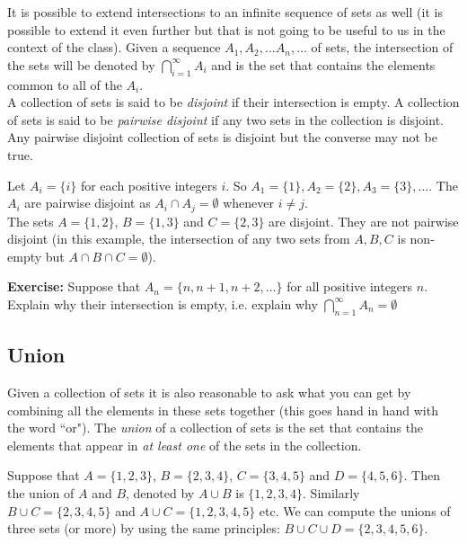 \begin{appendices}
		It is possible to extend intersections to an infinite sequence of sets as well (it is possible to extend it even further but that is not going to be useful to us in the context of the class). Given a sequence $A_1,A_2,\ldots A_n,\ldots$ of sets, the intersection of the sets will be denoted by $\bigcap_{i=1}^\infty A_i$ and is the set that contains the elements common to all of the $A_i$.\\
		
		A collection of sets is said to be \textit{disjoint} if their intersection is empty. A collection of sets is said to be \textit{pairwise disjoint} if any two sets in the collection is disjoint. Any pairwise disjoint collection of sets is disjoint but the converse may not be true.  
		
		\begin{ex}
			Let $A_i=\{i\}$ for each positive integers $i$. So $A_1=\{1\},  A_2=\{2\}, A_3=\{3\}, \ldots$. The $A_i$ are pairwise disjoint as $A_i\cap A_j = \emptyset$ whenever $i\neq j$.\\
			
			The sets $A= \{1,2\}$, $B= \{1,3\}$ and $C= \{2,3\}$ are disjoint. They are not pairwise disjoint (in this example, the intersection of any two sets from $A, B, C$ is non-empty but $A\cap B \cap C=\emptyset$). 
		\end{ex}
		
		
		\noindent\textbf{Exercise:}  Suppose that $A_n=\{n, n+1, n+2, \ldots \}$ for all positive integers $n$. Explain why their intersection is empty, i.e. explain why $\bigcap_{n=1}^\infty A_n=\emptyset$
		
		\subsection{Union}
		
		Given a collection of sets it is also reasonable to ask what you can get by combining all the elements in these sets together (this goes hand in hand with the word ``or"). The \textit{union} of a collection of sets is the set that contains the elements that appear in \textit{at least one} of the sets in the collection.
		
		\begin{ex}
			Suppose that $A=\{1, 2, 3\}$, $B=\{2, 3, 4\}$, $C=\{3, 4, 5\}$ and $D=\{4, 5, 6\}$. Then the union of $A$ and $B$, denoted by $A\cup B$ is $\{1, 2, 3, 4\}$. Similarly $B\cup C=\{2, 3, 4, 5\}$ and $A\cup C=\{1, 2, 3, 4, 5\}$ etc. We can compute the unions of three sets (or more) by using the same principles: $B\cup C\cup D=\{2, 3, 4, 5, 6\}$. 
		\end{ex} 
		

\end{appendices}
